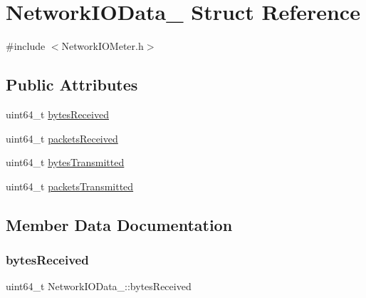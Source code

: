 \hypertarget{structNetworkIOData__}{}\section{Network\+I\+O\+Data\+\_\+ Struct Reference}
\label{structNetworkIOData__}


{\ttfamily \#include $<$Network\+I\+O\+Meter.\+h$>$}

\subsection*{Public Attributes}
\begin{DoxyCompactItemize}
\item 
uint64\+\_\+t \hyperlink{structNetworkIOData___acf0e6540342cf6803b77c9324d7bdec6}{bytes\+Received}
\item 
uint64\+\_\+t \hyperlink{structNetworkIOData___ade14b698d116cf9e9f86dce3f40b6bfc}{packets\+Received}
\item 
uint64\+\_\+t \hyperlink{structNetworkIOData___ad18a076526184bd9e1314e22dcc2ad44}{bytes\+Transmitted}
\item 
uint64\+\_\+t \hyperlink{structNetworkIOData___aeaf36b99dcef5149d0afa559201fe6ad}{packets\+Transmitted}
\end{DoxyCompactItemize}


\subsection{Member Data Documentation}
\mbox{\label{structNetworkIOData___acf0e6540342cf6803b77c9324d7bdec6}} 
\subsubsection{\texorpdfstring{bytes\+Received}{bytesReceived}}
{\footnotesize\ttfamily uint64\+\_\+t Network\+I\+O\+Data\+\_\+\+::bytes\+Received}

\mbox{\label{structNetworkIOData___ad18a076526184bd9e1314e22dcc2ad44}} 
